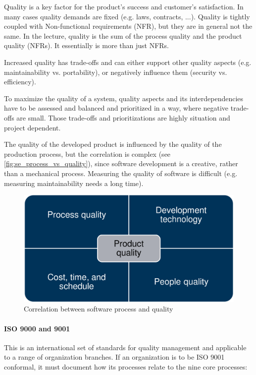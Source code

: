 Quality is a key factor for the product's success and customer's satisfaction.
In many cases quality demands are fixed (e.g. laws, contracts, ...).
Quality is tightly coupled with Non-functional requirements (NFR), but they are in general not the same.
In the lecture, quality is the sum of the process quality and the product quality (NFRs). It essentially is more than just NFRs.

Increased quality has trade-offs and can either support other quality aspects (e.g. maintainability vs. portability), or negatively influence them (security vs. efficiency).

To maximize the quality of a system, quality aspects and its interdependencies have to be assessed and balanced and prioritized in a way, where negative trade-offs are small.
Those trade-offs and prioritizations are highly situation and project dependent.

The quality of the developed product is influenced by the quality of the production process, but the correlation is complex (see \autoref{fig:se_process_vs_quality}), since software development is a creative, rather than a mechanical process.
Measuring the quality of software is difficult (e.g. measuring maintainability needs a long time).

\begin{figure}[h]
    \centering
    \includegraphics[width=0.5\linewidth]{images/process_vs_quality.png}
    \caption{Correlation between software process and quality}\label{fig:se_process_vs_quality}
\end{figure}

\paragraph{ISO 9000 and 9001}
This is an international set of standards for quality management and applicable to a range of organization branches.
If an organization is to be ISO 9001 conformal, it must document how its
processes relate to the nine core processes:\\

